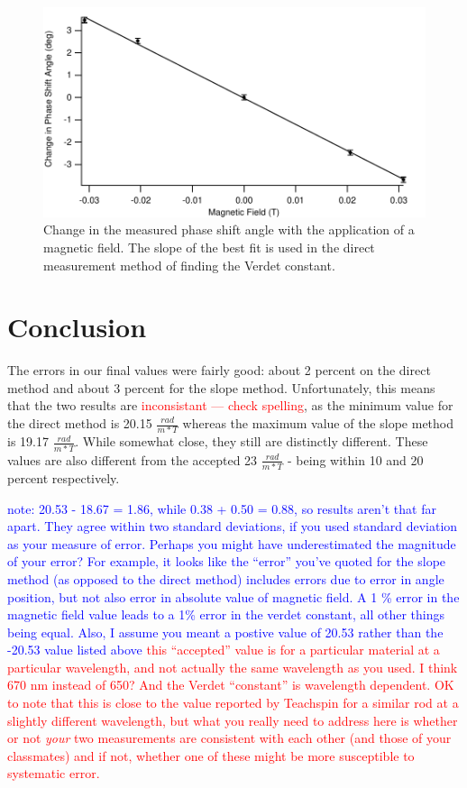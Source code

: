 \documentclass[prb,preprint]{revtex4-1}
\begin{document}
\begin{figure}[h]
\includegraphics[width=180mm]{dTheta_dT.pdf}
\caption{\label{dTheta_dT}Change in the measured phase shift angle with the application of a magnetic field. The slope of the best fit is used in the direct measurement method of finding the Verdet constant.}

\end{figure}

\section{Conclusion}
The errors in our final values were fairly good: about 2 percent on the direct method and about 3 percent for the slope method. Unfortunately, this means that the two results are \textcolor{red}{inconsistant --- check spelling}, as the minimum value for the direct method is 20.15 $\frac{rad}{m*T}$ whereas the maximum value of the slope method is 19.17 $\frac{rad}{m*T}$. While somewhat close, they still are distinctly different. These values are also different from the accepted 23 $\frac{rad}{m*T}$ - being within 10 and 20 percent respectively. 

\textcolor{blue}{note: 20.53 - 18.67 = 1.86, while 0.38 + 0.50 = 0.88, so results aren't that far apart. They agree within two standard deviations, if you used standard deviation as your measure of error. Perhaps you might have underestimated the magnitude of your error? For example,  it looks like the ``error'' you've quoted for the slope method (as opposed to the direct method) includes errors due to error in angle position, but not also error in absolute value of magnetic field. A 1 \% error in the magnetic field value leads to a 1\% error in the verdet constant, all other things being equal. Also, I assume you meant a postive value of 20.53 rather than the -20.53 value listed above }\textcolor{red}{this ``accepted'' value is for a particular material at a particular wavelength, and not actually the same wavelength as you used. I think 670 nm instead of 650? And the Verdet ``constant'' is wavelength dependent. OK to note that this is close to the value reported by Teachspin for a similar rod at a slightly different wavelength, but what you really need to address here is whether or not \textit{your} two measurements are consistent with each other (and those of your classmates)  and if not, whether one of these might be more susceptible to systematic error.  }
\end{document}
